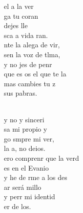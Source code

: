 \begin{cancion}%
	 el a la ver \\
	ga tu coran \\
	  dejes lle\\
	sca a vida ran. \\
\jump
	nte la alega de vir, \\
	sen la voz de tlma, \\
	y no jes de penr\\
	que es os el que te la\\
	mas  cambies tu z\\
	 sus pabras.\\\jump\\
	\begin{chorus}%
	y no y sinceri\\
	sa mi propio y\\
	go smpre mi ver,\\
	 la a, no deios.\\
\jump
	ero comprenr que la verd\\
	es en el Evanio \\
	y he de rme a los des \\
	ar será millo\\
	y perr mi identid\\
	er de los.\\
	\end{chorus}%
	\jump\\
\end{cancion}%
